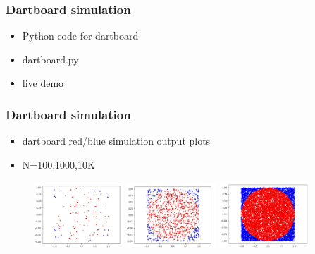 \documentclass[english,14pt]{beamer}
\begin{document}

\begin{frame}[fragile]

\frametitle{Dartboard simulation}

\begin{itemize}
	\item Python code for dartboard
	\item dartboard.py
	\item live demo
\end{itemize}

\end{frame}


\begin{frame}[fragile]

\frametitle{Dartboard simulation}

\begin{itemize}
	\item dartboard red/blue simulation output plots
	\item N=100,1000,10K
\end{itemize}

\begin{figure}[ht]
	\centering
	\includegraphics[width=0.3\textwidth]{figures/dartboard100}%
	\includegraphics[width=0.3\textwidth]{figures/dartboard1000}%
	\includegraphics[width=0.3\textwidth]{figures/dartboard10000}
\end{figure}

\end{frame}
\end{document}
